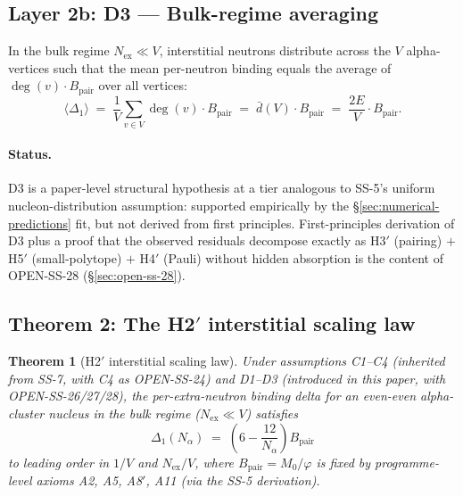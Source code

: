 \documentclass[11pt,letterpaper]{article}
\newtheorem{theorem}{Theorem}[section]
\theoremstyle{definition}
\newcommand{\Mzero}{M_0}
\newcommand{\phig}{\varphi}
\newcommand{\Bpair}{B_{\text{pair}}}
\newcommand{\Nalpha}{N_\alpha}
\newcommand{\Nex}{N_{\text{ex}}}
\newcommand{\degv}{\deg(v)}
\begin{document}
\subsection{Layer 2b: D3 --- Bulk-regime averaging}
\label{sec:d3}

In the bulk regime $\Nex \ll V$, interstitial neutrons distribute across the $V$ alpha-vertices such that the mean per-neutron binding equals the average of $\degv \cdot \Bpair$ over all vertices:
\begin{equation}
  \langle \Delta_1 \rangle \;=\; \frac{1}{V} \sum_{v \in V} \degv \cdot \Bpair \;=\; \bar{d}(V) \cdot \Bpair \;=\; \frac{2E}{V} \cdot \Bpair.
  \label{eq:d3}
\end{equation}

\paragraph{Status.} D3 is a paper-level structural hypothesis at a tier analogous to SS-5's uniform nucleon-distribution assumption: supported empirically by the \S\ref{sec:numerical-predictions} fit, but not derived from first principles. First-principles derivation of D3 plus a proof that the observed residuals decompose exactly as H3$'$ (pairing) $+$ H5$'$ (small-polytope) $+$ H4$'$ (Pauli) without hidden absorption is the content of OPEN-SS-28 (\S\ref{sec:open-ss-28}).

\subsection{Theorem 2: The H2$'$ interstitial scaling law}
\label{sec:theorem2}

\begin{theorem}[H2$'$ interstitial scaling law]
\label{thm:h2prime}
Under assumptions C1--C4 (inherited from SS-7, with C4 as OPEN-SS-24) and D1--D3 (introduced in this paper, with OPEN-SS-26/27/28), the per-extra-neutron binding delta for an even-even alpha-cluster nucleus in the bulk regime ($\Nex \ll V$) satisfies
\begin{equation}
  \Delta_1(\Nalpha) \;=\; \left(6 - \frac{12}{\Nalpha}\right) \Bpair
  \label{eq:thm2}
\end{equation}
to leading order in $1/V$ and $\Nex/V$, where $\Bpair = \Mzero/\phig$ is fixed by programme-level axioms A2, A5, A8$'$, A11 (via the SS-5 derivation).
\end{theorem}
\end{document}
